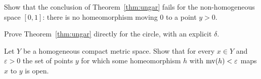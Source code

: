 \begin{exercise}
Show that the conclusion of Theorem~\ref{thm:ungar} fails for the non-homogeneous space $[0,1]$: there
is no homeomorphism moving $0$ to a point $y>0$.
\end{exercise}

\begin{exercise}
Prove Theorem~\ref{thm:ungar} directly for the circle, with an explicit $\delta$.
\end{exercise}

\begin{exercise}
Let $Y$ be a homogeneous compact metric space. Show that for every $x\in Y$ and $\varepsilon>0$ the set
of points $y$ for which some homeomorphism $h$ with $\operatorname{mv}(h)<\varepsilon$ maps $x$ to $y$ is open.
\end{exercise}

